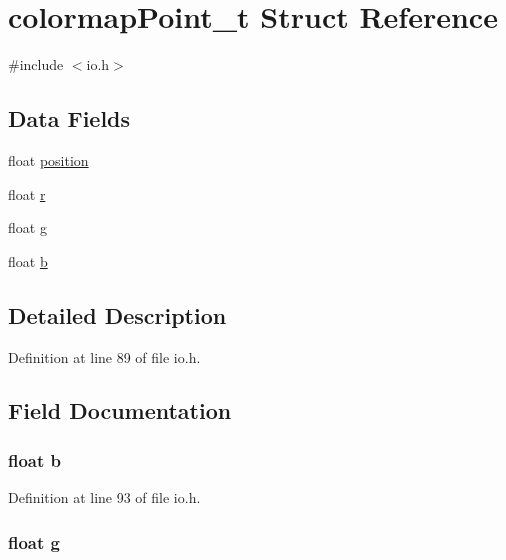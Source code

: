 \hypertarget{structcolormapPoint__t}{\section{colormap\-Point\-\_\-t Struct Reference}
\label{structcolormapPoint__t}
}


{\ttfamily \#include $<$io.\-h$>$}

\subsection*{Data Fields}
\begin{DoxyCompactItemize}
\item 
float \hyperlink{structcolormapPoint__t_a76777b356ab2a080225682528119c4fe}{position}
\item 
float \hyperlink{structcolormapPoint__t_a4788d82c901b9367dd5c0daff8a7616b}{r}
\item 
float \hyperlink{structcolormapPoint__t_a8cf17d727651616de6f2b79ef32170cd}{g}
\item 
float \hyperlink{structcolormapPoint__t_a83fc1af92e29717b4513d121b0c72c7d}{b}
\end{DoxyCompactItemize}


\subsection{Detailed Description}


Definition at line 89 of file io.\-h.



\subsection{Field Documentation}
\hypertarget{structcolormapPoint__t_a83fc1af92e29717b4513d121b0c72c7d}{
\subsubsection[{b}]{\setlength{\rightskip}{0pt plus 5cm}float b}}\label{structcolormapPoint__t_a83fc1af92e29717b4513d121b0c72c7d}


Definition at line 93 of file io.\-h.

\hypertarget{structcolormapPoint__t_a8cf17d727651616de6f2b79ef32170cd}{
\subsubsection[{g}]{\setlength{\rightskip}{0pt plus 5cm}float g}}\label{structcolormapPoint__t_a8cf17d727651616de6f2b79ef32170cd}


